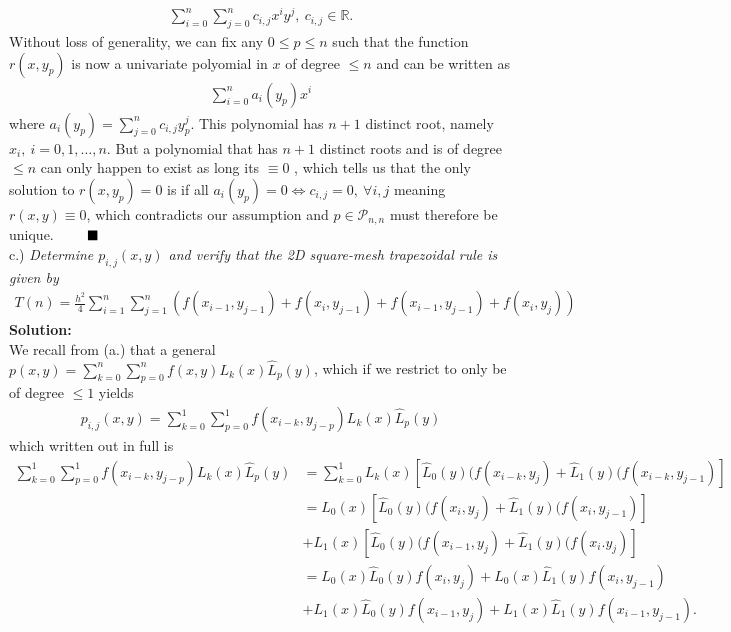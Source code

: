 \documentclass[12pt,
               a4paper,
               article,
               oneside,
               english,oldfontcommands]{memoir}
\newcommand{\Q}{ \qquad \hfill \blacksquare}
\newcommand{\spaze}{\vspace{4mm}\\}
\begin{document}
\begin{align*}
\sum_{i=0}^{n}\sum_{j=0}^{n} c_{i,j}x^{i}y^{j}, \ c_{i,j} \in \mathbb{R}.
\end{align*}
Without loss of generality, we can fix any $ 0 \leq p \leq n$ such that the function $r(x, y_p)$ is now a univariate polyomial in $x$ of degree $\leq n$ and can be written as
\begin{align*}
\sum_{i=0}^{n} a_{i}(y_p)x^{i}
\end{align*} 
where $  a_{i}(y_p) = \sum_{j=0}^{n} c_{i,j} y_{p}^{j}$.  This polynomial has $n+1$ distinct root, namely $x_i, \ i=0, 1, \ldots, n$. But a polynomial that has $n+1$ distinct roots and is of degree $\leq n$ can only happen to exist as long its $\equiv 0$ , which tells us that the only solution to $r(x, y_p) = 0 $ is if all $a_{i}(y_p) = 0 \iff c_{i,j} =0, \ \forall i,j$ meaning $r(x,y) \equiv 0$, which contradicts our assumption and $p \in \mathcal{P}_{n,n}$ must therefore be unique. $\Q$\spaze
c.) \emph{Determine $p_{i,j}(x,y)$ and verify that the 2D square-mesh trapezoidal rule is given by}
\begin{align*}
T(n) = \frac{h^2}{4}\sum_{i=1}^{n}\sum_{j=1}^{n} \left( f(x_{i-1}, y_{j-1}) + f(x_i, y_{j-1}) +  f(x_{i-1}, y_{j-1}) +  f(x_i, y_{j}) \right)
\end{align*}
\textbf{Solution:} \spaze
We recall from (a.) that a general $p(x,y) = \sum_{k = 0}^{n}  \sum_{p = 0}^{n} f(x, y) L_k(x) \hat{L}_{p}(y)$, which if we restrict to only be of degree $\leq 1$ yields \begin{align*}
p_{i,j}(x,y) = \sum_{k = 0}^{1}  \sum_{p = 0}^{1} f(x_{i -k}, y_{j - p}) L_k(x) \hat{L}_{p}(y)
\end{align*}
which written out in full is
\begin{align*}
\sum_{k = 0}^{1}  \sum_{p = 0}^{1} f(x_{i -k}, y_{j - p})  L_k(x) \hat{L}_{p}(y) &= \sum_{k = 0}^{1} L_{k}(x) \left[\hat{L}_{0}(y) (f(x_{i-k}, y_{j})+ \hat{L}_{1}(y) (f(x_{i-k}, y_{j-1}) \right] \\[5pt]
&= L_{0}(x) \left[\hat{L}_{0}(y) (f(x_{i}, y_{j})+ \hat{L}_{1}(y) (f(x_{i}, y_{j-1}) \right] \\[5pt]
&+ L_{1}(x) \left[\hat{L}_{0}(y) (f(x_{i-1}, y_{j})+ \hat{L}_{1}(y) (f(x_{i}. y_{j}) \right] \\[8pt]
&=   L_{0}(x) \hat{L}_{0}(y) f(x_{i}, y_{j}) +   L_{0}(x) \hat{L}_{1}(y) f(x_{i}, y_{j-1})\\[5pt]
&+  L_{1}(x) \hat{L}_{0}(y) f(x_{i-1}, y_{j})+ L_{1}(x)\hat{L}_{1}(y) f(x_{i-1}, y_{j-1}).
\end{align*}
\end{document}
